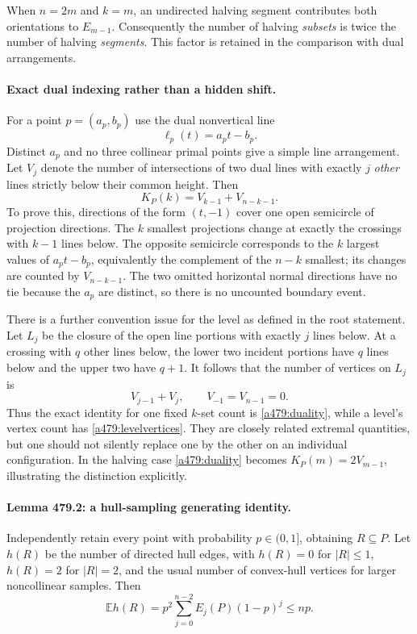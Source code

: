 \documentclass[11pt]{article}
\begin{document}
When $n=2m$ and $k=m$, an undirected halving segment contributes both
orientations to $E_{m-1}$. Consequently the number of halving \emph{subsets}
is twice the number of halving \emph{segments}. This factor is retained
in the comparison with dual arrangements.

\paragraph{Exact dual indexing rather than a hidden shift.}
For a point $p=(a_p,b_p)$ use the dual nonvertical line
\[
                              \ell_p(t)=a_pt-b_p.
\]
Distinct $a_p$ and no three collinear primal points give a simple line
arrangement. Let $V_j$ denote the number of intersections of two dual
lines with exactly $j$ \emph{other} lines strictly below their common
height. Then
\begin{equation}\label{a479:duality}
                      K_P(k)=V_{k-1}+V_{n-k-1}.
\end{equation}
To prove this, directions of the form $(t,-1)$ cover one open semicircle
of projection directions. The $k$ smallest projections change at exactly
the crossings with $k-1$ lines below. The opposite semicircle corresponds
to the $k$ largest values of $a_pt-b_p$, equivalently the complement of
the $n-k$ smallest; its changes are counted by $V_{n-k-1}$. The two
omitted horizontal normal directions have no tie because the $a_p$ are
distinct, so there is no uncounted boundary event.

There is a further convention issue for the level as defined in the root
statement. Let $L_j$ be the closure of the open line portions with exactly
$j$ lines below. At a crossing with $q$ other lines below, the lower
two incident portions have $q$ lines below and the upper two have $q+1$.
It follows that the number of vertices on $L_j$ is
\begin{equation}\label{a479:levelvertices}
                             V_{j-1}+V_j,
             \qquad V_{-1}=V_{n-1}=0.
\end{equation}
Thus the exact identity for one fixed $k$-set count is
\eqref{a479:duality}, while a level's vertex count has
\eqref{a479:levelvertices}. They are closely related extremal quantities,
but one should not silently replace one by the other on an individual
configuration. In the halving case \eqref{a479:duality} becomes
$K_P(m)=2V_{m-1}$, illustrating the distinction explicitly.

\paragraph{Lemma 479.2: a hull-sampling generating identity.}
Independently retain every point with probability $p\in(0,1]$, obtaining
$R\subseteq P$. Let $h(R)$ be the number of directed hull edges, with
$h(R)=0$ for $|R|\leq1$, $h(R)=2$ for $|R|=2$, and the usual number
of convex-hull vertices for larger noncollinear samples. Then
\begin{equation}\label{a479:sampling}
                   \mathbb E h(R)
                   =p^2\sum_{j=0}^{n-2}E_j(P)(1-p)^j
                   \leq np.
\end{equation}
\end{document}
